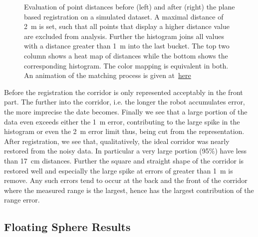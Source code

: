 \begin{figure}
\begin{minipage}[c]{0.49\textwidth}
  	\end{minipage} 	
 	\caption{Evaluation of point distances before (left) and after (right) the plane based registration on a simulated dataset. A maximal distance of \SI{2}{m} is set, such that all points that display a higher distance value are excluded from analysis. Further the histogram joins all values with a distance greater than \SI{1}{m} into the last bucket. The top two column shows a heat map of distances while the bottom shows the corresponding histogram. The color mapping is equivalent in both. An animation of the matching process is given at~\href{https://youtu.be/0ps5Pg4qo4E}{here}}
 	\label{fig:simulatedEvaluation}
\end{figure} 

Before the registration the corridor is only represented acceptably in the front part. 
The further into the corridor, i.e. the longer the robot accumulates error, the more imprecise the date becomes. 
Finally we see that a large portion of the data even exceeds either the \SI{1}{\meter} error, contributing to the large spike in the histogram or even the \SI{2}{\meter} error limit thus, being cut from the representation. 
After registration, we see that, qualitatively, the ideal corridor was nearly restored from the noisy data. 
In particular a very large portion (95\%) have less than \SI{17}{\centi\meter} distances.
Further the square and straight shape of the corridor is restored well and especially the large spike at errors of greater than \SI{1}{m} is remove. 
Any such errors tend to occur at the back and the front of the corridor where the measured range is the largest, hence has the largest contribution of the range error. 

\subsection{Floating Sphere Results}

